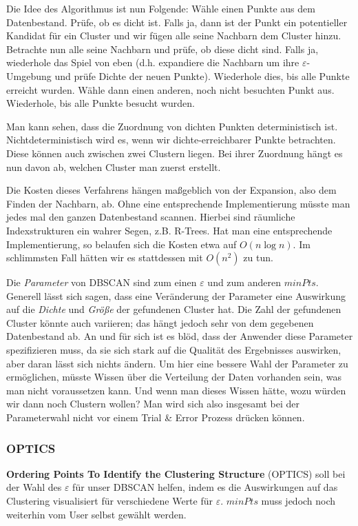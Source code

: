 Die Idee des Algorithmus ist nun Folgende: Wähle einen Punkte aus
dem Datenbestand. Prüfe, ob es dicht ist. Falls ja, dann ist der Punkt
ein potentieller Kandidat für ein Cluster und wir fügen alle seine Nachbarn
dem Cluster hinzu. Betrachte nun alle seine Nachbarn und prüfe, ob diese
dicht sind. Falls ja, wiederhole das Spiel von eben (d.h. expandiere die
Nachbarn um ihre \(\varepsilon\)-Umgebung und prüfe Dichte der neuen
Punkte). Wiederhole dies, bis alle Punkte erreicht wurden. Wähle dann
einen anderen, noch nicht besuchten Punkt aus. Wiederhole, bis alle Punkte
besucht wurden.

Man kann sehen, dass die Zuordnung von dichten Punkten deterministisch
ist. Nichtdeterministisch wird es, wenn wir dichte-erreichbarer Punkte
betrachten. Diese können auch zwischen zwei Clustern liegen. Bei ihrer
Zuordnung hängt es nun davon ab, welchen Cluster man zuerst erstellt.

Die Kosten dieses Verfahrens hängen maßgeblich von der Expansion, also
dem Finden der Nachbarn, ab. Ohne eine entsprechende Implementierung
müsste man jedes mal den ganzen Datenbestand scannen. Hierbei sind
räumliche Indexstrukturen ein wahrer Segen, z.B. R-Trees. Hat man eine
entsprechende Implementierung, so belaufen sich die Kosten etwa auf
\(O(n \log n)\). Im schlimmsten Fall hätten wir es stattdessen mit
\(O(n^2)\) zu tun.

Die \textit{Parameter} von DBSCAN sind zum einen \(\varepsilon\) und
zum anderen \(minPts\). Generell lässt sich sagen, dass eine Veränderung
der Parameter eine Auswirkung auf die \textit{Dichte} und
\textit{Größe} der gefundenen Cluster hat. Die Zahl der gefundenen Cluster
könnte auch variieren; das hängt jedoch sehr von dem gegebenen Datenbestand ab.
An und für sich ist es blöd, dass der Anwender diese Parameter spezifizieren 
muss, da sie sich stark auf die Qualität des Ergebnisses auswirken, aber
daran lässt sich nichts ändern. Um hier eine bessere Wahl der Parameter
zu ermöglichen, müsste Wissen über die Verteilung der Daten vorhanden
sein, was man nicht voraussetzen kann. Und wenn man dieses Wissen hätte,
wozu würden wir dann noch Clustern wollen? Man wird sich also insgesamt bei
der Parameterwahl nicht vor einem Trial \& Error Prozess drücken können.

\subsubsection{OPTICS}
\textbf{Ordering Points To Identify the Clustering Structure} (OPTICS) 
soll bei der Wahl des \(\varepsilon\) für unser DBSCAN helfen, indem es
die Auswirkungen auf das Clustering visualisiert für verschiedene Werte für
\(\varepsilon\). \(minPts\) muss jedoch noch weiterhin vom User selbst
gewählt werden.

